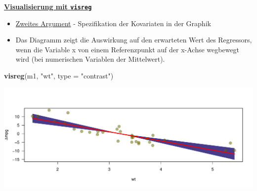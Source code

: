\documentclass[ignorenonframetext,]{beamer}
\newenvironment{Shaded}{\begin{snugshade}}{\end{snugshade}}
\newcommand{\DataTypeTok}[1]{\textcolor[rgb]{0.13,0.29,0.53}{#1}}
\newcommand{\KeywordTok}[1]{\textcolor[rgb]{0.13,0.29,0.53}{\textbf{#1}}}
\newcommand{\NormalTok}[1]{#1}
\newcommand{\StringTok}[1]{\textcolor[rgb]{0.31,0.60,0.02}{#1}}
\providecommand{\tightlist}{%
  \setlength{\itemsep}{0pt}\setlength{\parskip}{0pt}}
\begin{document}
\begin{frame}[fragile]{\href{http://myweb.uiowa.edu/pbreheny/publications/visreg.pdf}{\textbf{Visualisierung
mit \texttt{visreg}}}}
\protect\hypertarget{visualisierung-mit-visreg}{}

\begin{itemize}
\tightlist
\item
  \href{http://pbreheny.github.io/visreg}{Zweites Argument} -
  Spezifikation der Kovariaten in der Graphik
\item
  Das Diagramm zeigt die Auswirkung auf den erwarteten Wert des
  Regressors, wenn die Variable x von einem Referenzpunkt auf der
  x-Achse wegbewegt wird (bei numerischen Variablen der Mittelwert).
\end{itemize}

\begin{Shaded}
\begin{Highlighting}[]
\KeywordTok{visreg}\NormalTok{(m1, }\StringTok{"wt"}\NormalTok{, }\DataTypeTok{type =} \StringTok{"contrast"}\NormalTok{)}
\end{Highlighting}
\end{Shaded}

\includegraphics{B3_linreg_files/figure-beamer/unnamed-chunk-32-1.pdf}

\end{frame}
\end{document}
